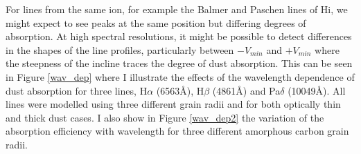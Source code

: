 For lines from the same ion, for example the Balmer and Paschen lines of 
H{\sc i}, we might expect to see peaks at the same position but differing 
degrees of absorption. At high spectral resolutions, it might be possible 
to detect differences in the shapes of the line profiles, particularly 
between $-V_{min}$ and $+V_{min}$ where the steepness of the incline 
traces the degree of dust absorption.  This can be seen in Figure 
\ref{wav_dep} where I illustrate the effects of the wavelength dependence 
of dust absorption for three lines, H$\alpha$ (6563\AA), H$\beta$ 
(4861\AA) and Pa$\delta$ (10049\AA).  All lines were modelled using three 
different grain radii and for both optically thin and thick dust cases.  
I also show in Figure \ref{wav_dep2} the variation of the absorption efficiency with wavelength 
for three different amorphous carbon grain radii.
%
%
